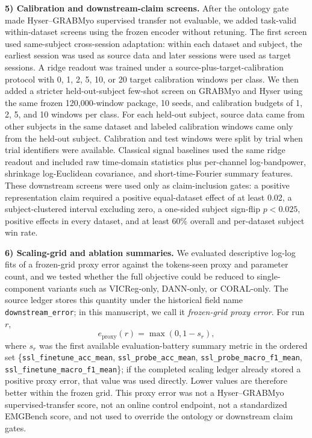 \documentclass[journal]{IEEEtran}
\begin{document}
\textbf{5) Calibration and downstream-claim screens.} After the ontology gate made Hyser--GRABMyo supervised transfer not evaluable, we added task-valid within-dataset screens using the frozen encoder without retuning. The first screen used same-subject cross-session adaptation: within each dataset and subject, the earliest session was used as source data and later sessions were used as target sessions. A ridge readout was trained under a source-plus-target-calibration protocol with 0, 1, 2, 5, 10, or 20 target calibration windows per class. We then added a stricter held-out-subject few-shot screen on GRABMyo and Hyser using the same frozen 120{,}000-window package, 10 seeds, and calibration budgets of 1, 2, 5, and 10 windows per class. For each held-out subject, source data came from other subjects in the same dataset and labeled calibration windows came only from the held-out subject. Calibration and test windows were split by trial when trial identifiers were available. Classical signal baselines used the same ridge readout and included raw time-domain statistics plus per-channel log-bandpower, shrinkage log-Euclidean covariance, and short-time-Fourier summary features. These downstream screens were used only as claim-inclusion gates: a positive representation claim required a positive equal-dataset effect of at least 0.02, a subject-clustered interval excluding zero, a one-sided subject sign-flip $p<0.025$, positive effects in every dataset, and at least 60\% overall and per-dataset subject win rate.

\textbf{6) Scaling-grid and ablation summaries.} We evaluated descriptive log-log fits of a frozen-grid proxy error against the tokens-seen proxy and parameter count, and we tested whether the full objective could be reduced to single-component variants such as VICReg-only, DANN-only, or CORAL-only. The source ledger stores this quantity under the historical field name \texttt{downstream\_error}; in this manuscript, we call it \emph{frozen-grid proxy error}. For run $r$,
\begin{equation}
e_{\mathrm{proxy}}(r)=\max(0,1-s_r),
\end{equation}
where $s_r$ was the first available evaluation-battery summary metric in the ordered set \{\texttt{ssl\_finetune\_acc\_mean}, \texttt{ssl\_probe\_acc\_mean}, \texttt{ssl\_probe\_macro\_f1\_mean}, \texttt{ssl\_finetune\_macro\_f1\_mean}\}; if the completed scaling ledger already stored a positive proxy error, that value was used directly. Lower values are therefore better within the frozen grid. This proxy error was not a Hyser--GRABMyo supervised-transfer score, not an online control endpoint, not a standardized EMGBench score, and not used to override the ontology or downstream claim gates.
\end{document}
